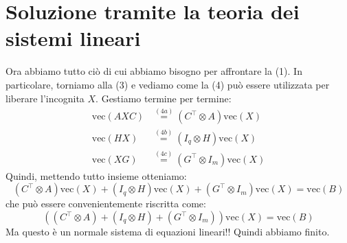 \documentclass[11pt, a4paper]{article}
\begin{document}
\section{Soluzione tramite la teoria dei sistemi lineari}
Ora abbiamo tutto ciò di cui abbiamo bisogno per affrontare la (1). In particolare, torniamo alla (3) e vediamo come la (4) può essere utilizzata per liberare l'incognita $X$. Gestiamo termine per termine:
\begin{align*}
\text{vec}(AXC) &\overset{(4a)}{=} (C^\top \otimes A)\text{vec}(X) \\
\text{vec}(HX) &\overset{(4b)}{=} (I_q \otimes H)\text{vec}(X) \\
\text{vec}(XG) &\overset{(4c)}{=} (G^\top \otimes I_m)\text{vec}(X)
\end{align*}
Quindi, mettendo tutto insieme otteniamo:
\begin{equation}
(C^\top \otimes A)\text{vec}(X) + (I_q \otimes H)\text{vec}(X) + (G^\top \otimes I_m)\text{vec}(X) = \text{vec}(B)
\end{equation}
che può essere convenientemente riscritta come:
\[
\left( (C^\top \otimes A) + (I_q \otimes H) + (G^\top \otimes I_m) \right) \text{vec}(X) = \text{vec}(B)
\]
Ma questo è un normale sistema di equazioni lineari!! Quindi abbiamo finito.
\end{document}
